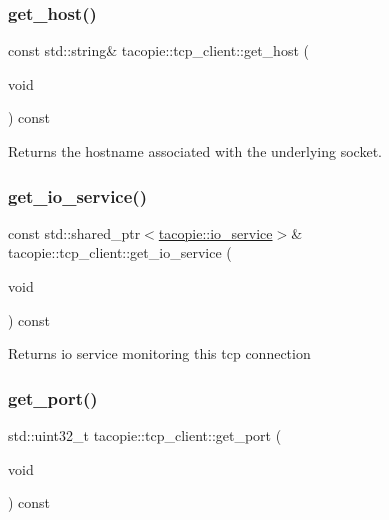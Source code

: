 \subsubsection{\texorpdfstring{get\+\_\+host()}{get\_host()}}
{\footnotesize\ttfamily const std\+::string\& tacopie\+::tcp\+\_\+client\+::get\+\_\+host (\begin{DoxyParamCaption}\item[{void}]{ }\end{DoxyParamCaption}) const}

\begin{DoxyReturn}{Returns}
the hostname associated with the underlying socket. 
\end{DoxyReturn}
\mbox{\label{classtacopie_1_1tcp__client_aafbf0aa37cd0472778d09fb163362314}} 
\subsubsection{\texorpdfstring{get\+\_\+io\+\_\+service()}{get\_io\_service()}}
{\footnotesize\ttfamily const std\+::shared\+\_\+ptr$<$\hyperlink{classtacopie_1_1io__service}{tacopie\+::io\+\_\+service}$>$\& tacopie\+::tcp\+\_\+client\+::get\+\_\+io\+\_\+service (\begin{DoxyParamCaption}\item[{void}]{ }\end{DoxyParamCaption}) const}

\begin{DoxyReturn}{Returns}
io service monitoring this tcp connection 
\end{DoxyReturn}
\mbox{\label{classtacopie_1_1tcp__client_a3b42ae2afe6d5ee5f2f16b8bd7846f37}} 
\subsubsection{\texorpdfstring{get\+\_\+port()}{get\_port()}}
{\footnotesize\ttfamily std\+::uint32\+\_\+t tacopie\+::tcp\+\_\+client\+::get\+\_\+port (\begin{DoxyParamCaption}\item[{void}]{ }\end{DoxyParamCaption}) const}

